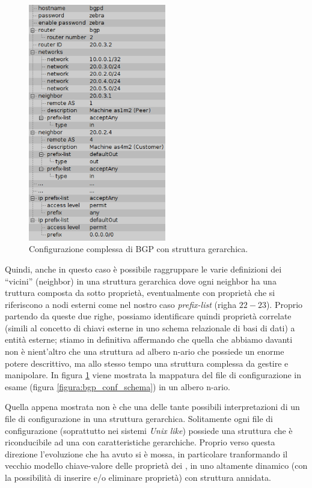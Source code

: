 \begin{figure}[!htb]
	\centering
	\includegraphics[width=6cm]{images/bgp_conf_tree.png}
	\caption{Configurazione complessa di BGP con struttura gerarchica.}
	\label{figura:bgp_conf_tree}
\end{figure}

Quindi, anche in questo caso è possibile raggruppare le varie definizioni dei ``vicini'' (neighbor) in una struttura gerarchica dove ogni neighbor ha una truttura composta da sotto proprietà, eventualmente con proprietà che si riferiscono a nodi esterni come nel nostro caso \emph{prefix-list} (righa $22-23$). Proprio partendo da queste due righe, possiamo identificare quindi proprietà correlate (simili al concetto di chiavi esterne in uno schema relazionale di basi di dati) a entità esterne; stiamo in definitiva affermando che quella che abbiamo davanti non è nient'altro che una struttura ad albero n-ario che possiede un enorme potere descrittivo, ma allo stesso tempo una struttura complessa da gestire e manipolare. In figura \ref{figura:bgp_conf_tree} viene mostrata la mappatura del file di configurazione in esame (figura \ref{figura:bgp_conf_schema}) in un albero n-ario.

Quella appena mostrata non è che una delle tante possibili interpretazioni di un file di configurazione in una struttura gerarchica. Solitamente ogni file di configurazione (soprattutto nei sistemi \emph{Unix like}) possiede una struttura che è riconducibile ad una con caratteristiche gerarchiche. Proprio verso questa direzione l'evoluzione che \visualnetkit{} ha avuto si è mossa, in particolare tranformando il vecchio modello chiave-valore delle proprietà dei \plugin{}, in uno altamente dinamico (con la possibilità di inserire e/o eliminare proprietà) con struttura annidata.

